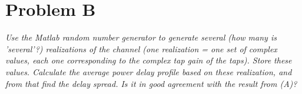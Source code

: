 \section{Problem B}
\textit{Use the Matlab random number generator to generate several (how many is 'several'?) realizations of the channel (one realization = one set of complex values, each one corresponding to the complex tap gain of the taps). Store these values. Calculate the average power delay profile based on these realization, and from that find the delay spread. Is it in good agreement with the result from (A)?}